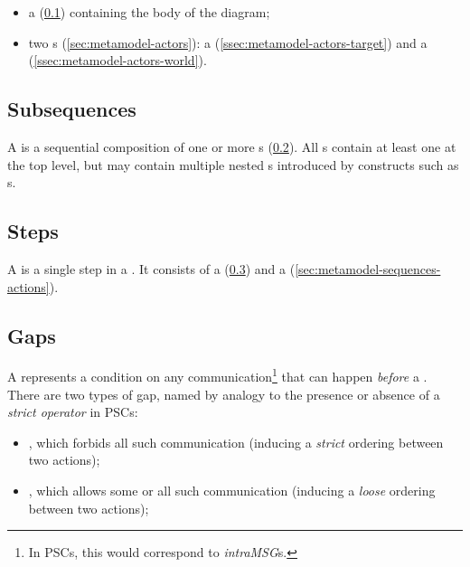 \begin{itemize}
\item
	a \msubsequence{} (\cref{ssec:metamodel-sequences-subsequences})
	containing the body of the diagram;
\item
	two \mactor s (\cref{sec:metamodel-actors}):
	a \mtargetactor{} (\cref{ssec:metamodel-actors-target})
	and a \mworld{} (\cref{ssec:metamodel-actors-world}).
\end{itemize}

\subsection{Subsequences}\label{ssec:metamodel-sequences-subsequences}

A \msubsequence{} is a sequential composition of one or more \msequencestep s
(\cref{ssec:metamodel-sequences-steps}).
All \msequence s contain at least one \msubsequence{} at the top level, but
may contain multiple nested \msubsequence s introduced by constructs such as
\mloopaction s.

\subsection{Steps}\label{ssec:metamodel-sequences-steps}

A \msequencestep{} is a single step in a \msubsequence.  It consists of a
\msequencegap{} (\cref{ssec:metamodel-sequences-gaps}) and a
\msequenceaction{} (\cref{sec:metamodel-sequences-actions}).

\subsection{Gaps}\label{ssec:metamodel-sequences-gaps}

A \msequencegap{} represents a condition on any communication\footnote{In PSCs,
this would correspond to \emph{intraMSG}s.} that can happen
\emph{before} a \msequenceaction.  There are two types of gap, named by analogy
to the presence or absence of a \emph{strict operator} in PSCs:

\begin{itemize}
\item
	\mstrictgap, which forbids all such communication (inducing
	a \emph{strict} ordering between two actions);
\item
	\mloosegap, which allows some or all such communication (inducing
	a \emph{loose} ordering between two actions);
\end{itemize}

